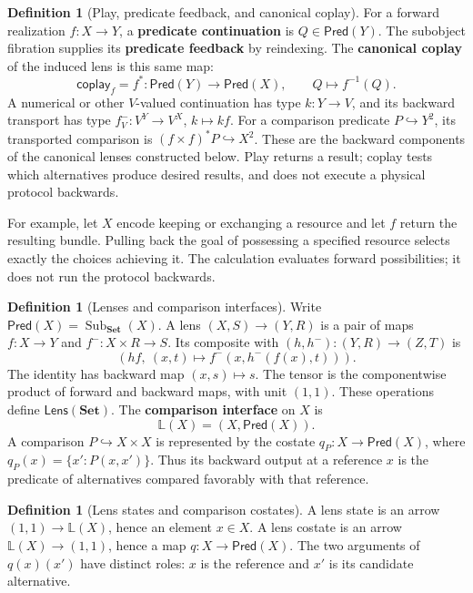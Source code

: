 \documentclass[11pt,a4paper]{article}
\numberwithin{equation}{section}
\theoremstyle{definition}
\newtheorem{definition}[theorem]{Definition}
\theoremstyle{remark}
\theoremstyle{plain}
\begin{document}
\begin{definition}[Play, predicate feedback, and canonical coplay]
\label{def:egt-play-continuation-coplay}
For a forward realization $f:X\to Y$, a \textbf{predicate
continuation} is $Q\in\mathsf{Pred}(Y)$. The subobject fibration
supplies its \textbf{predicate feedback} by reindexing. The
\textbf{canonical coplay} of the induced lens is this same map:
\[
 \mathsf{coplay}_f=f^*:\mathsf{Pred}(Y)
 \longrightarrow\mathsf{Pred}(X),\qquad Q\longmapsto f^{-1}(Q).
\]
A numerical or other $V$-valued continuation has type $k:Y\to V$,
and its backward transport has type
$f_V^-:V^Y\to V^X$, $k\mapsto kf$.
For a comparison predicate $P\hookrightarrow Y^2$, its transported
comparison is $(f\times f)^*P\hookrightarrow X^2$. These are the
backward components of the canonical lenses constructed below. Play
returns a result; coplay tests which alternatives produce desired
results, and does not execute a physical protocol backwards.
\end{definition}
For example, let $X$ encode keeping or exchanging a resource and let
$f$ return the resulting bundle. Pulling back the goal of possessing a
specified resource selects exactly the choices achieving it. The
calculation evaluates forward possibilities; it does not run the protocol
backwards.

\begin{definition}[Lenses and comparison interfaces]
\label{def:cgt-comparison-lens}
Write $\mathsf{Pred}(X)=\operatorname{Sub}_{\mathbf{Set}}(X)$.
A lens $(X,S)\to(Y,R)$ is a pair of maps
$f:X\to Y$ and $f^-:X\times R\to S$. Its composite with
$(h,h^-):(Y,R)\to(Z,T)$ is
\[
 (hf,\ (x,t)\longmapsto f^-(x,h^-(f(x),t))).
\]
The identity has backward map $(x,s)\mapsto s$. The tensor is the
componentwise product of forward and backward maps, with unit $(1,1)$.
These operations define $\mathsf{Lens}(\mathbf{Set})$.
The \textbf{comparison interface} on $X$ is
\[
 \mathbb L(X)=(X,\mathsf{Pred}(X)).
\]
A comparison $P\hookrightarrow X\times X$ is represented by the costate
$q_P:X\to\mathsf{Pred}(X)$, where
$q_P(x)=\{x':P(x,x')\}$. Thus its backward output at a reference $x$
is the predicate of alternatives compared favorably with that reference.
\end{definition}

\begin{definition}[Lens states and comparison costates]
\label{def:egt-lens-states-costates}
A lens state is an arrow $(1,1)\to\mathbb L(X)$, hence an element
$x\in X$. A lens costate is an arrow $\mathbb L(X)\to(1,1)$, hence a map
$q:X\to\mathsf{Pred}(X)$. The two arguments of $q(x)(x')$ have distinct
roles: $x$ is the reference and $x'$ is its candidate alternative.
\end{definition}
\end{document}

